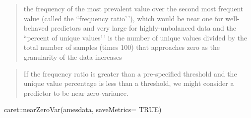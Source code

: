 \documentclass[
]{book}
\newenvironment{Shaded}{\begin{snugshade}}{\end{snugshade}}
\newcommand{\AttributeTok}[1]{\textcolor[rgb]{0.77,0.63,0.00}{#1}}
\newcommand{\ConstantTok}[1]{\textcolor[rgb]{0.00,0.00,0.00}{#1}}
\newcommand{\FunctionTok}[1]{\textcolor[rgb]{0.00,0.00,0.00}{#1}}
\newcommand{\NormalTok}[1]{#1}
\newcommand{\SpecialCharTok}[1]{\textcolor[rgb]{0.00,0.00,0.00}{#1}}
\begin{document}
\begin{quote}
the frequency of the most prevalent value over the second most frequent value (called the ``frequency ratio'\,'), which would be near one for well-behaved predictors and very large for highly-unbalanced data and
the ``percent of unique values'\,' is the number of unique values divided by the total number of samples (times 100) that approaches zero as the granularity of the data increases
\end{quote}

\begin{quote}
If the frequency ratio is greater than a pre-specified threshold and the unique value percentage is less than a threshold, we might consider a predictor to be near zero-variance.
\end{quote}

\begin{Shaded}
\begin{Highlighting}[]
\NormalTok{caret}\SpecialCharTok{::}\FunctionTok{nearZeroVar}\NormalTok{(amesdata, }\AttributeTok{saveMetrics=} \ConstantTok{TRUE}\NormalTok{)}
\end{Highlighting}
\end{Shaded}
\end{document}
